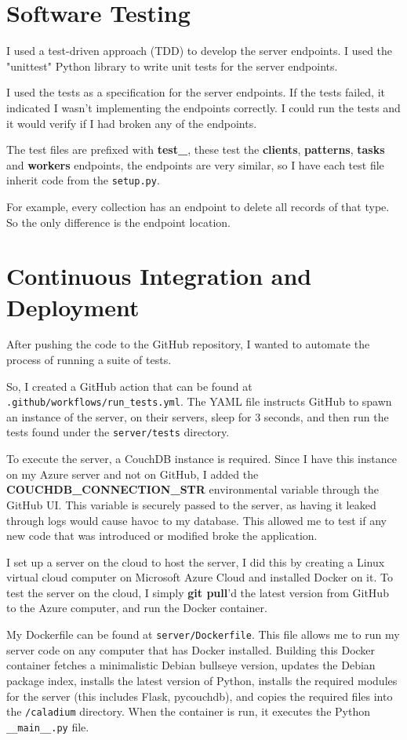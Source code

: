 \section{Software Testing}
I used a test-driven approach (TDD) to develop the server endpoints.
I used the "unittest" Python library to write unit tests for the server endpoints.

I used the tests as a specification for the server endpoints.
If the tests failed, it indicated I wasn't implementing the endpoints correctly.
I could run the tests and it would verify if I had broken any of the endpoints.

The test files are prefixed with \textbf{test\_},
these test the \textbf{clients}, \textbf{patterns},
\textbf{tasks} and \textbf{workers} endpoints,
the endpoints are very similar, so I have each test file
inherit code from the \texttt{setup.py}.

For example, every collection has an endpoint to delete all records of that type.
So the only difference is the endpoint location.

\section{Continuous Integration and Deployment}
After pushing the code to the GitHub repository,
I wanted to automate the process of running a suite of tests.

So, I created a GitHub action that can be found at \\
\texttt{.github/workflows/run\_tests.yml}.
The YAML file instructs GitHub to spawn an instance of the server, on their servers,
sleep for 3 seconds, and then run the tests found
under the \texttt{server/tests} directory.

To execute the server, a CouchDB instance is required.
Since I have this instance on my Azure server and not on GitHub, I added the \\
\textbf{COUCHDB\_CONNECTION\_STR}
environmental variable through the GitHub UI.
This variable is securely passed to the server,
as having it leaked through logs would cause havoc to my database.
This allowed me to test if any new code that was introduced or modified broke the application.

I set up a server on the cloud to host the server,
I did this by creating a Linux virtual cloud computer on
Microsoft Azure Cloud and installed Docker on it.
To test the server on the cloud, I simply \textbf{git pull}'d
the latest version from GitHub to the Azure computer,
and run the Docker container.

My Dockerfile can be found at \texttt{server/Dockerfile}.
This file allows me to run my server code on any computer that has Docker installed.
Building this Docker container fetches a minimalistic Debian bullseye version,
updates the Debian package index, installs the latest version of Python,
installs the required modules for the server (this includes Flask, pycouchdb),
and copies the required files into the \texttt{/caladium} directory.
When the container is run, it executes the Python \texttt{\_\_main\_\_.py} file.
